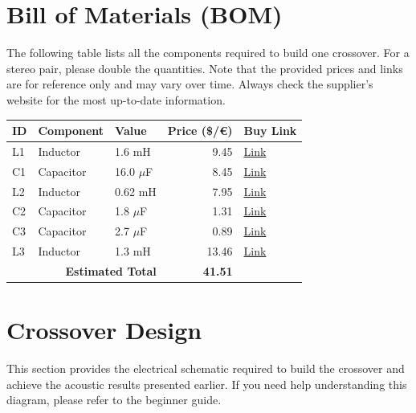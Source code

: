 \documentclass[11pt,a4paper]{report}
\begin{document}
\chapter{Bill of Materials (BOM)}
The following table lists all the components required to build one crossover. For a stereo pair, please double the quantities. Note that the provided prices and links are for reference only and may vary over time. Always check the supplier's website for the most up-to-date information.

\vspace{0.5cm}
\begin{table}[H]
    \centering
    \renewcommand{\arraystretch}{1.5}
    \begin{tabular}{@{}lllrl@{}}
        \toprule
        \textbf{ID} & \textbf{Component} & \textbf{Value} & \textbf{Price (\$/€)} & \textbf{Buy Link} \\
        \midrule
        L1 & Inductor & 1.6 mH & 9.45 & \href{https://www.soundimports.eu/en/jantzen-audio-000-2389.html}{Link} \\
        C1 & Capacitor & 16.0 $\mu$F & 8.45 & \href{https://www.soundimports.eu/en/jantzen-audio-001-0269.html}{Link} \\
        L2 & Inductor & 0.62 mH & 7.95 & \href{https://www.soundimports.eu/en/jantzen-audio-000-2347.html}{Link} \\
        C2 & Capacitor & 1.8 $\mu$F & 1.31 & \href{https://www.parts-express.com/Jantzen-0237-1.8uF-400V-Crosscap-Capacitor-027-914}{Link} \\
        C3 & Capacitor & 2.7 $\mu$F & 0.89 & \href{https://www.parts-express.com/2.7uF-100V-Non-Polarized-Capacitor-027-326}{Link} \\
        L3 & Inductor & 1.3 mH & 13.46 & \href{https://www.soundimports.eu/en/jantzen-audio-000-5005.html}{Link} \\
        \midrule
        \multicolumn{3}{r}{\textbf{Estimated Total}} & \textbf{41.51} & \\
        \bottomrule
    \end{tabular}
\end{table}


\chapter{Crossover Design}
This section provides the electrical schematic required to build the crossover and achieve the acoustic results presented earlier. If you need help understanding this diagram, please refer to the beginner guide.
\end{document}
